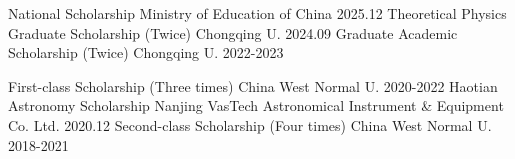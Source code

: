 \begin{cvhonors}

  \cvhonor
    {National Scholarship} %
    {Ministry of Education of China} %
    {} %
    {2025.12} %
  \cvhonor
    {Theoretical Physics Graduate Scholarship (Twice)} %
    {Chongqing U.} %
    {} %
    {2024.09} %
  \cvhonor
    {Graduate Academic Scholarship (Twice)} %
    {Chongqing U.} %
    {} %
    {2022-2023} %

  \cvhonor
    {First-class Scholarship (Three times)} %
    {China West Normal U.} %
    {} %
    {2020-2022} %
  \cvhonor
    {Haotian Astronomy Scholarship} %
    {Nanjing VasTech Astronomical Instrument \& Equipment Co. Ltd.} %
    {} %
    {2020.12} %
  \cvhonor
    {Second-class Scholarship (Four times)} %
    {China West Normal U.} %
    {} %
    {2018-2021} %
\end{cvhonors}
